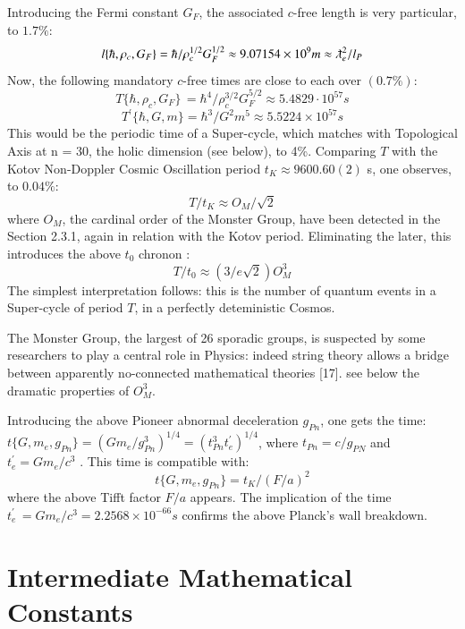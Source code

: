 \documentclass[twoside,draft]{article}
\begin{document}
\begin{sloppypar}
{Introducing the Fermi constant $G_{F}$, the associated $c$-free length is very particular, to $1.7\%$:
$$l\{\hbar,\rho_{c},G_{F}\} = \hbar/\rho_{c}^{1/2} G_{F}^{1/2} \approx 9.07154 \times 10^{9} m \approx \lambdabar_{e}^{2}/l_{P}$$
Now, the following mandatory $c$-free times are close to each over $(0.7\%)$:
\begin{equation}
T\{\hbar,\rho_{c} ,G_{F} \}\, = \hbar^{4} /\rho_{c}^{3/2} G_{F}^{5/2} \approx 5.4829 \cdot 10^{57} s
\end{equation}
\begin{equation}
T^{\prime}\{\hbar,G,m\} = \hbar^{3} /G^{2} m^{5} \approx 5.5224 \times 10^{57} s
\end{equation}
This would be the periodic time of a Super-cycle, which matches with Topological Axis at n = 30,
the holic dimension (see below), to 4\%. Comparing $T$ with the Kotov Non-Doppler Cosmic
Oscillation period $t_{K} \approx 9600.60(2)$ s, one observes, to $0.04\%$:
$$T/t_{K} \approx O_{M} /\sqrt{2}$$
where $O_{M}$, the cardinal order of the Monster Group, have been detected in the Section 2.3.1, again in relation with the Kotov period. Eliminating the later, this introduces the above $t_0$ chronon :
\begin{equation}
T/t_0 \approx (3/e\sqrt{2})O_M^3
\end{equation}
The simplest interpretation follows: this is the number of quantum events in a Super-cycle of period $T$, in a perfectly deteministic Cosmos. 

The  Monster  Group,  the largest of 26 sporadic groups, is suspected by some researchers to play a central role in Physics: indeed string theory allows a bridge between apparently no-connected mathematical theories [17]. see below the dramatic properties of $O_M^3$.

Introducing the above Pioneer abnormal deceleration $g_{Pn}$, one gets the time: 
$
t\{G, m_{e} , g_{Pn} \} = (Gm_{e} /g_{Pn}^{3} )^{1/4} = (t_{Pn}^{3} t^{\prime}_{e} )^{1/4}
$, where $t_{Pn} = c/g_{PN}$ and $t^{\prime}_{e} = Gm_{e} /c^{3}$ . This time is compatible with:
\begin{equation}
t\{G, m_{e} , g_{Pn} \} = t_{K} /(F/a)^{2}
\end{equation}
where the above Tifft factor $F/a$ appears. The implication of the time 
$t^{\prime}_{e}\, = Gm_{e} /c^{3} = 2.2568 \times 10^{-66} s$
confirms the above Planck's wall breakdown.

\section{Intermediate Mathematical Constants}
}
\end{sloppypar}
\end{document}
